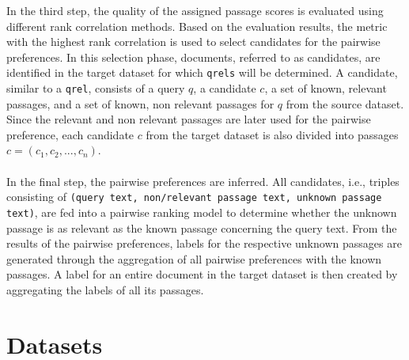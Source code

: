 In the third step, the quality of the assigned passage scores is evaluated using different rank correlation methods. Based on the evaluation results, the metric with the highest rank correlation is used to select candidates for the pairwise preferences. In this selection phase, documents, referred to as candidates, are identified in the target dataset for which \texttt{qrels} will be determined. A candidate, similar to a \texttt{qrel}, consists of a query $q$, a candidate $c$, a set of known, relevant passages, and a set of known, non relevant passages for $q$ from the source dataset. Since the relevant and non relevant passages are later used for the pairwise preference, each candidate $c$ from the target dataset is also divided into passages $c=(c_1, c_2, ..., c_n)$.
\\\\
In the final step, the pairwise preferences are inferred. All candidates, i.e., triples consisting of \texttt{(query text, non/relevant passage text, unknown passage text)}, are fed into a pairwise ranking model to determine whether the unknown passage is as relevant as the known passage concerning the query text. From the results of the pairwise preferences, labels for the respective unknown passages are generated through the aggregation of all pairwise preferences with the known passages. A label for an entire document in the target dataset is then created by aggregating the labels of all its passages.

\pagebreak


\section{Datasets}\label{datasets}

